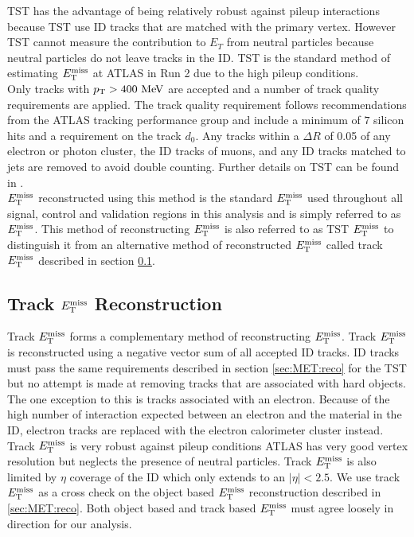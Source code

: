\indent TST has the advantage of being relatively robust against pileup interactions because TST use ID tracks that are matched with the primary vertex. However TST cannot measure the contribution to $E_T$ from neutral particles because neutral particles do not leave tracks in the ID.  TST is the standard method of estimating $E_{\mathrm{T}}^{\mathrm{miss}}$ at ATLAS in Run 2 due to the high pileup conditions. \\

\indent  Only tracks with $\pt > 400 \mev$ are accepted and a number of track quality requirements are applied.  The track quality requirement follows recommendations from the ATLAS tracking performance group and include a minimum of $7$ silicon hits and a requirement on the track $d_0$.  Any tracks within a $\Delta R$ of 0.05 of any electron or photon cluster, the ID tracks of muons, and any ID tracks matched to jets are removed to avoid double counting.  Further details on TST can be found in \cite{METReco}.  \\

\indent $E_{\mathrm{T}}^{\mathrm{miss}}$ reconstructed using this method is the standard $E_{\mathrm{T}}^{\mathrm{miss}}$ used throughout all signal, control and validation regions in this analysis and is simply referred to as $E_{\mathrm{T}}^{\mathrm{miss}}$.  This method of reconstructing $E_{\mathrm{T}}^{\mathrm{miss}}$ is also referred to as TST $E_{\mathrm{T}}^{\mathrm{miss}}$ to distinguish it from an alternative method of reconstructed $E_{\mathrm{T}}^{\mathrm{miss}}$ called track $E_{\mathrm{T}}^{\mathrm{miss}}$ described in section \ref{sec:reco:trkMET}. \\

\subsection{Track $E_{\mathrm{T}}^{\mathrm{miss}}$ Reconstruction}
\label{sec:reco:trkMET}

\indent Track $E_{\mathrm{T}}^{\mathrm{miss}}$ forms a complementary method of reconstructing $E_{\mathrm{T}}^{\mathrm{miss}}$.  Track $E_{\mathrm{T}}^{\mathrm{miss}}$ is reconstructed using a negative vector sum of all accepted ID tracks.  ID tracks must pass the same requirements described in section \ref{sec:MET:reco} for the TST but no attempt is made at removing tracks that are associated with hard objects.  The one exception to this is tracks associated with an electron.  Because of the high number of interaction expected between an electron and the material in the ID, electron tracks are replaced with the electron calorimeter cluster instead.  \\

\indent Track $E_{\mathrm{T}}^{\mathrm{miss}}$ is very robust against pileup conditions ATLAS has very good vertex resolution but neglects the presence of neutral particles.  Track $E_{\mathrm{T}}^{\mathrm{miss}}$ is also limited by $\eta$ coverage of the ID which only extends to an $|\eta| < 2.5$.  We use track $E_{\mathrm{T}}^{\mathrm{miss}}$ as a cross check on the object based $E_{\mathrm{T}}^{\mathrm{miss}}$ reconstruction described in \ref{sec:MET:reco}. Both object based and track based $E_{\mathrm{T}}^{\mathrm{miss}}$ must agree loosely in direction for our analysis.  \\

